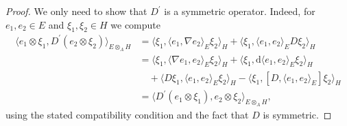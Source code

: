 \begin{proof}
    We only need to show that $D^{\prime}$ is a symmetric operator. Indeed, for $e_1, e_2\in E$ and $\xi_1, \xi_2\in H$ we compute
    \[
    \begin{split}
        \langle e_1\otimes\xi_1, D^{\prime}(e_2\otimes\xi_2)\rangle_{E\otimes_AH}&=\langle\xi_1,\langle e_1,\nabla e_2\rangle_E\xi_2\rangle_H+\langle\xi_1,\langle e_1, e_2\rangle_ED\xi_2\rangle_H\\
        &=\langle\xi_1,\langle\nabla e_1,e_2\rangle_E\xi_2\rangle_H+\langle\xi_1,\text{d}\langle e_1,e_2\rangle_E\xi_2\rangle_H \\
        &\quad+\langle D\xi_1,\langle e_1, e_2\rangle_E\xi_2\rangle_H-\langle\xi_1,[D,\langle e_1,e_2\rangle_E]\xi_2\rangle_H \\
        &=\langle D^{\prime}(e_1\otimes\xi_1),e_2\otimes\xi_2\rangle_{E\otimes_AH},
    \end{split}
    \]
    using the stated compatibility condition and the fact that $D$ is symmetric.
\end{proof}